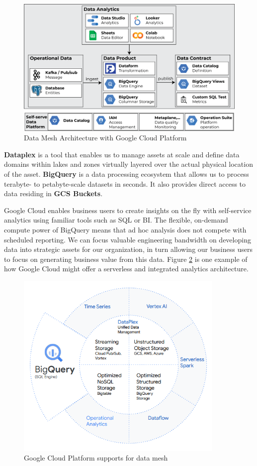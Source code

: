\documentclass[12pt, a4paper]{book}
\begin{document}
\begin{figure}[h]
	\begin{framed}
		\centering
		\includegraphics[width=12cm]{DataMeshGCP.png}
		\caption{Data Mesh Architecture with Google Cloud Platform}
		\label{DataMeshGCP}
	\end{framed}
\end{figure}

\textbf{Dataplex} is a tool that enables us to manage assets at scale and define data domains within lakes and zones virtually layered over the actual physical location of the asset. \textbf{BigQuery} is a data processing ecosystem that allows us to process terabyte- to petabyte-scale datasets in seconds. It also provides direct access to data residing in \textbf{GCS Buckets}.

Google Cloud enables business users to create insights on the fly with self-service analytics using familiar tools such as SQL or BI. The flexible, on-demand compute power of BigQuery means that ad hoc analysis does not compete with scheduled reporting. We can focus valuable engineering bandwidth on developing data into strategic assets for our organization, in turn allowing our business users to focus on generating business value from this data. Figure \ref{GCPDataMesh} is one example of how Google Cloud might offer a serverless and integrated analytics architecture.

\begin{figure}[h]
	\begin{framed}
		\centering
		\includegraphics[width=10cm]{GCPDataMesh.png}
		\caption{Google Cloud Platform supports for data mesh}
		\label{GCPDataMesh}
	\end{framed}
\end{figure}
\end{document}
